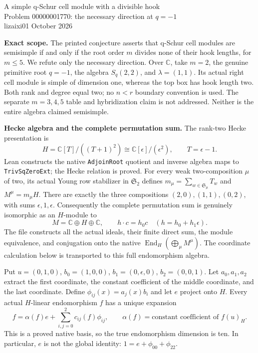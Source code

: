 \documentclass[11pt]{article}
\newcommand{\C}{\mathbb C}
\newcommand{\End}{\operatorname{End}}
\begin{document}
\begin{center}
{\Large A simple q-Schur cell module with a divisible hook}\\[4pt]
{\large Problem 00000001770: the necessary direction at $q=-1$}\\[3pt]
lizaixi01 October 2026
\end{center}

\textbf{Exact scope.}
The printed conjecture asserts that q-Schur cell modules are semisimple
if and only if the root order $m$ divides none of their hook lengths,
for $m\le5$. We refute only the necessary direction. Over $\C$, take
$m=2$, the genuine primitive root $q=-1$, the algebra $S_q(2,2)$, and
$\lambda=(1,1)$. Its actual right cell module is simple of dimension one,
whereas the top box has hook length two. Both rank and degree equal two;
no $n<r$ boundary convention is used. The separate $m=3,4,5$ table and
hybridization claim is not addressed. Neither is the entire algebra claimed
semisimple.

\textbf{Hecke algebra and the complete permutation sum.}
The rank-two Hecke presentation is
\[
 H=\C[T]/((T+1)^2)\cong\C[\epsilon]/(\epsilon^2),\qquad T=\epsilon-1.
\]
Lean constructs the native \texttt{AdjoinRoot} quotient and inverse algebra
maps to \texttt{TrivSqZeroExt}; the Hecke relation is proved. For every
weak two-composition $\mu$ of two, its actual Young row stabilizer in
$\mathfrak S_2$ defines $m_\mu=\sum_{w\in\mathfrak S_\mu}T_w$ and
$M^\mu=m_\mu H$. There are exactly the three compositions
$(2,0),(1,1),(0,2)$, with sums $\epsilon,1,\epsilon$. Consequently the
complete permutation sum is genuinely isomorphic as an $H$-module to
\[
 M=\C\oplus H\oplus\C,\qquad h\cdot c=h_0c
 \quad(h=h_0+h_1\epsilon).
\]
The file constructs all the actual ideals, their finite direct sum, the
module equivalence, and conjugation onto the native
$\End_H(\bigoplus_\mu M^\mu)$. The coordinate calculation below is
transported to this full endomorphism algebra.

Put $u=(0,1,0)$, $b_0=(1,0,0)$, $b_1=(0,\epsilon,0)$,
$b_2=(0,0,1)$. Let $a_0,a_1,a_2$ extract the first coordinate, the
constant coefficient of the middle coordinate, and the last coordinate.
Define $\phi_{ij}(x)=a_j(x)b_i$ and let $e$ project onto $H$.
Every actual $H$-linear endomorphism $f$ has a unique expansion
\[
 f=\alpha(f)e+\sum_{i,j=0}^2 c_{ij}(f)\phi_{ij},
 \qquad \alpha(f)=\text{constant coefficient of }f(u)_H.
\]
This is a proved native basis, so the true endomorphism dimension is ten.
In particular, $e$ is not the global identity:
$1=e+\phi_{00}+\phi_{22}$.
\end{document}

